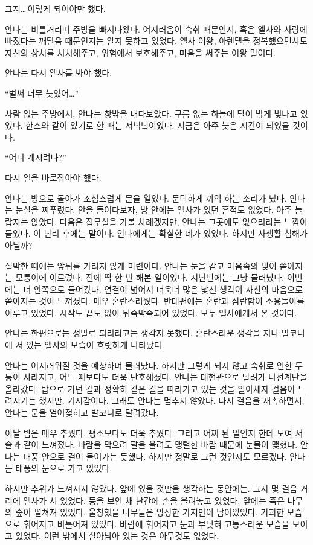 그저\ldots\,이렇게 되어야만 했다.

안나는 비틀거리며 주방을 빠져나왔다. 어지러움이 숙취 때문인지, 혹은 엘사와 사랑에 빠졌다는 깨달음 때문인지는 알지 못하고 있었다. 엘사 여왕, 아렌델을 정복했으면서도 자신의 상처를 처치해주고, 위험에서 보호해주고, 마음을 써주는 여왕 말이다.

안나는 다시 엘사를 봐야 했다.

``벌써 너무 늦었어\ldots''

사람 없는 주방에서, 안나는 창밖을 내다보았다. 구름 없는 하늘에 달이 밝게 빛나고 있었다. 한스와 같이 있기로 한 때는 저녁녘이었다. 지금은 아주 늦은 시간이 되었을 것이다.

``어디 계시려나?''

다시 일을 바로잡아야 했다.

안나는 방으로 돌아가 조심스럽게 문을 열었다. 둔탁하게 끼익 하는 소리가 났다. 안나는 눈살을 찌푸렸다. 안을 들여다보자, 방 안에는 엘사가 있던 흔적도 없었다. 아주 놀랍지는 않았다. 다음은 집무실을 가볼 차례겠지만, 안나는 그곳에도 없으리라는 느낌이 들었다. 이 난리 후에는 말이다. 안나에게는 확실한 데가 있었다. 하지만 사생활 침해가 아닐까?

절박한 때에는 앞뒤를 가리지 않게 마련이다. 안나는 눈을 감고 마음속의 빛이 쏟아지는 모퉁이에 이르렀다. 전에 딱 한 번 해본 일이었다. 지난번에는 그냥 물러났다. 이번에는 더 안쪽으로 들어갔다. 연결이 넓어져 더욱더 많은 낯선 생각이 자신의 마음으로 쏟아지는 것이 느껴졌다. 매우 혼란스러웠다. 반대편에는 혼란과 심란함이 소용돌이를 이루고 있었다. 시작도 끝도 없이 뒤죽박죽되어 있었다. 모두 엘사에게서 온 것이다.

안나는 한편으로는 정말로 되리라고는 생각지 못했다. 혼란스러운 생각을 지나 발코니에 서 있는 엘사의 모습이 흐릿하게 나타났다.

안나는 어지러워질 것을 예상하며 물러났다. 하지만 그렇게 되지 않고 숙취로 인한 두통이 사라지고, 어느 때보다도 더욱 단호해졌다. 안나는 대현관으로 달려가 나선계단을 올라갔다. 탑으로 가던 길과 정확히 같은 길을 따라가고 있는 것을 알아채자 걸음이 느려지기는 했지만. 기시감이다. 그래도 안나는 멈추지 않았다. 다시 걸음을 재촉하면서, 안나는 문을 열어젖히고 발코니로 달려갔다.

\textbreak

이날 밤은 매우 추웠다. 평소보다도 더욱 추웠다. 그리고 어찌 된 일인지 한데 모여 서슬과 같이 느껴졌다. 바람을 막으려 팔을 올려도 맹렬한 바람 때문에 눈물이 맺혔다. 안나는 태풍 안으로 걸어 들어가는 듯했다. 하지만 정말로 그런 것인지도 모르겠다. 안나는 태풍의 눈으로 가고 있었다.

하지만 추위가 느껴지지 않았다. 앞에 있을 것만을 생각하는 동안에는. 그저 몇 걸음 거리에 엘사가 서 있었다. 등을 보인 채 난간에 손을 올려놓고 있었다. 앞에는 죽은 나무의 숲이 펼쳐져 있었다. 울창했을 나무들은 앙상한 가지만이 남아있었다. 기괴한 모습으로 휘어지고 비틀어져 있었다. 바람에 휘어지고 눈과 부딪혀 고통스러운 모습을 보이고 있었다. 이런 밖에서 살아남아 있는 것은 아무것도 없었다.

